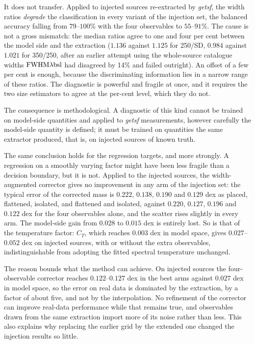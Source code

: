 \documentclass[11pt,a4paper]{article}
\begin{document}
It does not transfer. Applied to injected sources re-extracted by
\emph{getsf}, the width ratios \emph{degrade} the classification in every
variant of the injection set, the balanced accuracy falling from $79$--$100$\%
with the four observables to $55$--$91$\%. The cause is not a gross
mismatch: the median ratios agree to one and four per cent between the model
side and the extraction ($1.136$ against $1.125$ for 250/SD, $0.984$ against
$1.021$ for 350/250, after an earlier attempt using the whole-source catalogue
widths $\rm FWHM\lambda bsl$ had disagreed by 14\% and failed outright). An
offset of a few per cent is enough, because the discriminating information lies
in a narrow range of these ratios. The diagnostic is powerful and fragile at
once, and it requires the two size estimators to agree at the per-cent level,
which they do not.

The consequence is methodological. A diagnostic of this kind cannot be trained
on model-side quantities and applied to \emph{getsf} measurements, however
carefully the model-side quantity is defined; it must be trained on quantities
the same extractor produced, that is, on injected sources of known truth.

The same conclusion holds for the regression targets, and more strongly. A
regression on a smoothly varying factor might have been less fragile than a
decision boundary, but it is not. Applied to the injected sources, the
width-augmented corrector gives no improvement in any arm of the injection set:
the typical error of the corrected mass is $0.222$, $0.138$, $0.190$ and
$0.129$ dex as placed, flattened, isolated, and flattened and isolated, against
$0.220$, $0.127$, $0.196$ and $0.122$ dex for the four observables alone, and
the scatter rises slightly in every arm. The model-side gain from $0.028$ to
$0.015$ dex is entirely lost. So is that of the temperature factor: $C_T$,
which reaches $0.003$ dex in model space, gives $0.027$--$0.052$ dex on
injected sources, with or without the extra observables, indistinguishable from
adopting the fitted spectral temperature unchanged.

The reason bounds what the method can achieve. On injected sources the
four-observable corrector reaches $0.122$--$0.127$ dex in the best arms against
$0.027$ dex in model space, so the error on real data is dominated by the
extraction, by a factor of about five, and not by the interpolation. No
refinement of the corrector can improve real-data performance while that
remains true, and observables drawn from the same extraction import more of its
noise rather than less. This also explains why replacing the earlier grid by
the extended one changed the injection results so little.
\end{document}
